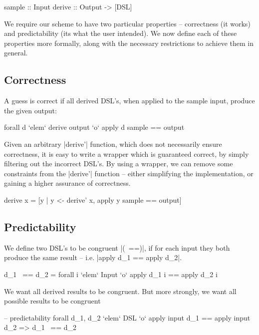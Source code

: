 \documentclass[preprint]{sigplanconf}
\begin{document}
\begin{code}
sample :: Input
derive :: Output -> [DSL]
\end{code}

We require our scheme to have two particular properties -- correctness (it works) and predictability (its what the user intended). We now define each of these properties more formally, along with the necessary restrictions to achieve them in general.

\subsection{Correctness}

A guess is correct if all derived DSL's, when applied to the sample input, produce the given output:

\ignore\begin{code}
forall d `elem` derive output `o` apply d sample == output
\end{code}

Given an arbitrary |derive'| function, which does not necessarily ensure correctness, it is easy to write a wrapper which is guaranteed correct, by simply filtering out the incorrect DSL's. By using a wrapper, we can remove some constraints from the |derive'| function -- either simplifying the implementation, or gaining a higher assurance of correctness.

\begin{code}
derive x = [y | y <- derive' x, apply y sample == output]
\end{code}

\subsection{Predictability}

We define two DSL's to be congruent |(~==)|, if for each input they both produce the same result -- i.e. |apply d_1 == apply d_2|.

\ignore\begin{code}
d_1 ~== d_2 = forall i `elem` Input `o` apply d_1 i == apply d_2 i
\end{code}

We want all derived results to be congruent. But more strongly, we want all possible results to be congruent

\begin{code}
-- predictability
forall d_1, d_2 `elem` DSL `o` apply input d_1 == apply input d_2 => d_1 ~== d_2
\end{code}
\end{document}
